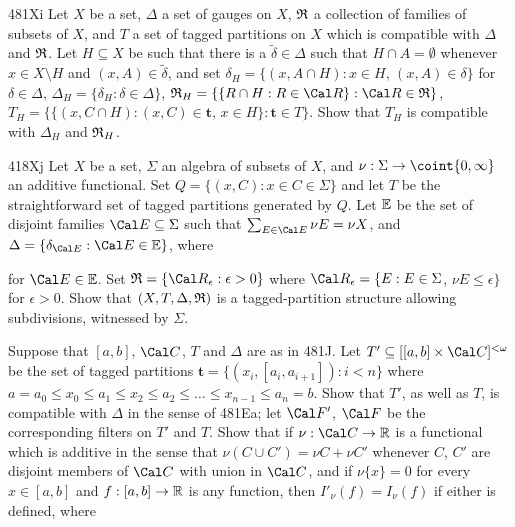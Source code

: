{\spheader 481Xi Let $X$ be a set, $\Delta$ a set of gauges on $X$,
$\frak R$ a collection of families of subsets of $X$, and $T$ a set of
tagged partitions on $X$ which is compatible with $\Delta$ and
$\frak R$.   Let $H\subseteq X$ be such that there is a
$\tilde\delta\in\Delta$ such that $H\cap A=\emptyset$ whenever
$x\in X\setminus H$ and $(x,A)\in\tilde\delta$, and set
$\delta_H=\{(x,A\cap H):x\in H,\,(x,A)\in\delta\}$ for
$\delta\in\Delta$, $\Delta_H=\{\delta_H:\delta\in\Delta\}$,
$\frak R_H=\{\{R\cap H:R\in\Cal R\}:\Cal R\in\frak R\}$,
$T_H=\{\{(x,C\cap H):(x,C)\in\pmb{t},\,x\in H\}:\pmb{t}\in T\}$.    Show
that $T_H$ is compatible with $\Delta_H$ and $\frak R_H$.

\spheader 418Xj Let $X$ be a set, $\Sigma$ an algebra of
subsets of $X$, and $\nu:\Sigma\to\coint{0,\infty}$ an additive functional.
Set $Q=\{(x,C):x\in C\in\Sigma\}$ and let $T$ be the straightforward set of
tagged partitions generated by $Q$.   Let $\Bbb E$ be the set of disjoint
families $\Cal E\subseteq\Sigma$ such that 
$\sum_{E\in\Cal E}\nu E=\nu X$, and 
$\Delta=\{\delta_{\Cal E}:\Cal E\in\Bbb E\}$, where


\noindent for $\Cal E\in\Bbb E$.
Set $\frak R=\{\Cal R_{\epsilon}:\epsilon>0\}$ where
$\Cal R_{\epsilon}=\{E:E\in\Sigma$, $\nu E\le\epsilon\}$ for $\epsilon>0$.
Show that $(X,T,\Delta,\frak R)$ is a tagged-partition structure allowing
subdivisions, witnessed by $\Sigma$.

Suppose that $[a,b]$, $\Cal C$, $T$ and $\Delta$ are as in 481J.   Let
$T'\subseteq[[a,b]\times\Cal C]^{<\omega}$ be the set of tagged
partitions $\pmb{t}=\{(x_i,[a_i,a_{i+1}]):i<n\}$ where
$a=a_0\le x_0\le a_1\le x_2\le a_2\le\ldots\le x_{n-1}\le a_n=b$.
Show that $T'$, as well as $T$, is compatible with $\Delta$ in the sense
of 481Ea;  let $\Cal F'$, $\Cal F$ be the corresponding filters on $T'$
and $T$.   Show that if $\nu:\Cal C\to\Bbb R$ is a functional which is
additive in the sense that $\nu(C\cup C')=\nu C+\nu C'$ whenever $C$,
$C'$ are disjoint members of $\Cal C$ with union in $\Cal C$, and if
$\nu\{x\}=0$ for every $x\in[a,b]$ and $f:[a,b]\to\Bbb R$ is any
function, then $I'_{\nu}(f)=I_{\nu}(f)$ if either is defined, where


}
